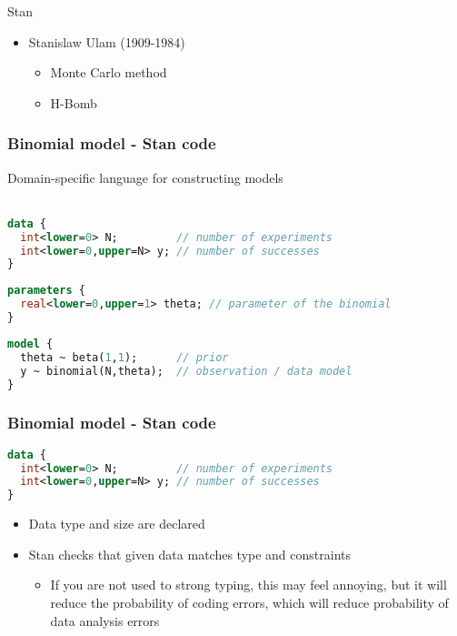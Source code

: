 \documentclass[finnish,english,t]{beamer}
\begin{document}
\begin{frame}{Stan}

  \begin{itemize}
  \item Stanislaw Ulam (1909-1984)
    \begin{itemize}
    \item Monte Carlo method
    \item H-Bomb
    \end{itemize}
  \end{itemize}
  
\end{frame}

\begin{frame}[fragile]
  \frametitle{Binomial model - Stan code}

  {Domain-specific language} for constructing models
  \\~
  
  {\small\color{gray}
{
  \begin{lstlisting}[language=Stan]
data {
  int<lower=0> N;         // number of experiments
  int<lower=0,upper=N> y; // number of successes
}
\end{lstlisting}}
  {
\begin{lstlisting}[language=Stan]
parameters {
  real<lower=0,upper=1> theta; // parameter of the binomial
}
\end{lstlisting}}
{
\begin{lstlisting}[language=Stan]
model {
  theta ~ beta(1,1);      // prior
  y ~ binomial(N,theta);  // observation / data model
}
\end{lstlisting}
}}
\end{frame} 

\begin{frame}[fragile]
  \frametitle{Binomial model - Stan code}
  
  {\small
  \begin{lstlisting}[language=Stan]
data {
  int<lower=0> N;         // number of experiments
  int<lower=0,upper=N> y; // number of successes
}
\end{lstlisting}}

  \begin{itemize}
  \item Data type and size are declared
  \item Stan checks that given data matches type and constraints
    \begin{itemize}
    \item<2-> If you are not used to strong typing, this may
      feel annoying, but it will reduce the probability of coding
      errors, which will reduce probability of data analysis errors
    \end{itemize}
  \end{itemize}
\end{frame}
\end{document}
